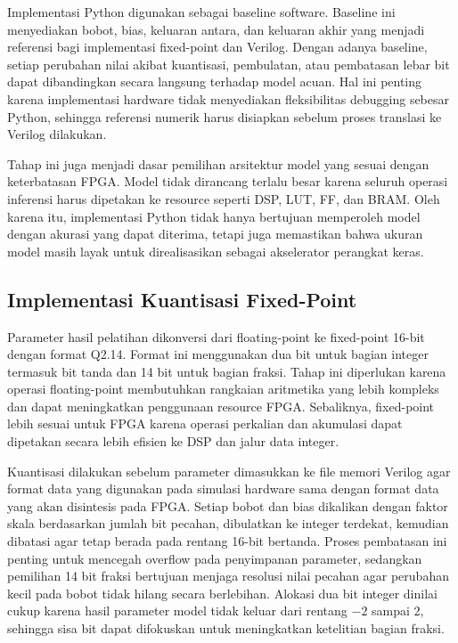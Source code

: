 	Implementasi Python digunakan sebagai baseline software. Baseline ini
	menyediakan bobot, bias, keluaran antara, dan keluaran akhir yang menjadi
	referensi bagi implementasi fixed-point dan Verilog. Dengan adanya baseline,
	setiap perubahan nilai akibat kuantisasi, pembulatan, atau pembatasan lebar
	bit dapat dibandingkan secara langsung terhadap model acuan. Hal ini penting
	karena implementasi hardware tidak menyediakan fleksibilitas debugging sebesar
	Python, sehingga referensi numerik harus disiapkan sebelum proses translasi ke
	Verilog dilakukan.

	Tahap ini juga menjadi dasar pemilihan arsitektur model yang sesuai dengan
	keterbatasan FPGA. Model tidak dirancang terlalu besar karena seluruh operasi
	inferensi harus dipetakan ke resource seperti DSP, LUT, FF, dan BRAM. Oleh
	karena itu, implementasi Python tidak hanya bertujuan memperoleh model dengan
	akurasi yang dapat diterima, tetapi juga memastikan bahwa ukuran model masih
	layak untuk direalisasikan sebagai akselerator perangkat keras.

    \subsection{Implementasi Kuantisasi Fixed-Point}
	Parameter hasil pelatihan dikonversi dari floating-point ke fixed-point 16-bit
	dengan format Q2.14. Format ini menggunakan dua bit untuk bagian integer
	termasuk bit tanda dan 14 bit untuk bagian fraksi. Tahap ini diperlukan karena
	operasi floating-point membutuhkan rangkaian aritmetika yang lebih kompleks
	dan dapat meningkatkan penggunaan resource FPGA. Sebaliknya, fixed-point lebih
	sesuai untuk FPGA karena operasi perkalian dan akumulasi dapat dipetakan
	secara lebih efisien ke DSP dan jalur data integer.

	Kuantisasi dilakukan sebelum parameter dimasukkan ke file memori Verilog agar
	format data yang digunakan pada simulasi hardware sama dengan format data yang
	akan disintesis pada FPGA. Setiap bobot dan bias dikalikan dengan faktor skala
	berdasarkan jumlah bit pecahan, dibulatkan ke integer terdekat, kemudian
	dibatasi agar tetap berada pada rentang 16-bit bertanda. Proses pembatasan ini
	penting untuk mencegah overflow pada penyimpanan parameter, sedangkan
	pemilihan 14 bit fraksi bertujuan menjaga resolusi nilai pecahan agar
	perubahan kecil pada bobot tidak hilang secara berlebihan. Alokasi dua bit
	integer dinilai cukup karena hasil parameter model tidak keluar dari rentang
	$-2$ sampai $2$, sehingga sisa bit dapat difokuskan untuk meningkatkan
	ketelitian bagian fraksi.

